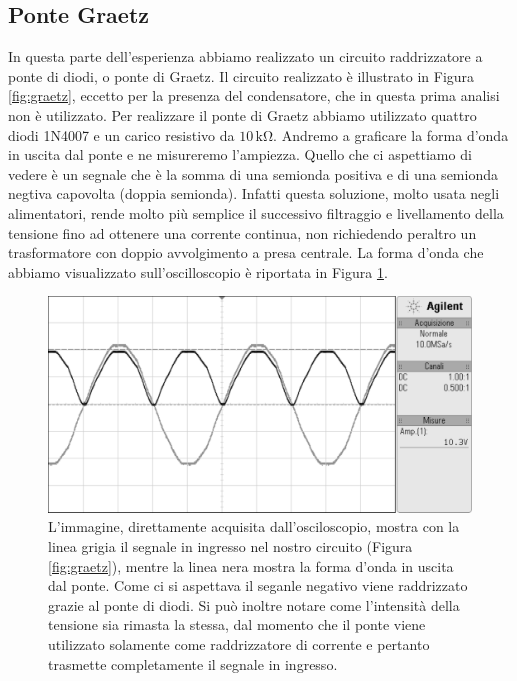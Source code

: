 \subsection*{Ponte Graetz}

In questa parte dell'esperienza abbiamo realizzato un circuito raddrizzatore a ponte di diodi, o ponte di Graetz. Il circuito realizzato è illustrato in Figura \ref{fig:graetz}, eccetto per la presenza del condensatore, che in questa prima analisi non è utilizzato.
Per realizzare il ponte di Graetz abbiamo utilizzato quattro diodi 1N4007 e un carico resistivo da $10\,\si{\kilo\ohm}$. Andremo a graficare la forma d'onda in uscita dal ponte e ne misureremo l'ampiezza.
Quello che ci aspettiamo di vedere è un segnale che è la somma di una semionda positiva e di una semionda negtiva capovolta (doppia semionda).
Infatti questa soluzione, molto usata negli alimentatori, rende molto più semplice il successivo filtraggio e livellamento della tensione fino ad ottenere una corrente continua, non richiedendo peraltro un trasformatore con doppio avvolgimento a presa centrale. La forma d'onda che abbiamo visualizzato sull'oscilloscopio è riportata in Figura \ref{fig:graetz2}.

\begin{figure}
    \includegraphics[width=\textwidth]{n2_bianco.pdf}
    \caption{L'immagine, direttamente acquisita dall'osciloscopio, mostra con la linea grigia il segnale in ingresso nel nostro circuito (Figura \ref{fig:graetz}), mentre la linea nera mostra la forma d'onda in uscita dal ponte. Come ci si aspettava il seganle negativo viene raddrizzato grazie al ponte di diodi. Si può inoltre notare come l'intensità della tensione sia rimasta la stessa, dal momento che il ponte viene utilizzato solamente come raddrizzatore di corrente e pertanto trasmette completamente il segnale in ingresso.}
    \label{fig:graetz2}
\end{figure}

